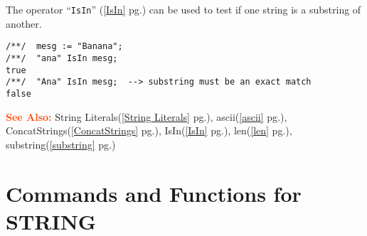 \documentclass[a4paper]{mybook}
\newcommand\SeeAlso{\par\textcolor{OrangeRed}{\textbf{\large See Also: }}}
\begin{document}
The operator ``\verb&IsIn&'' (\ref{IsIn} pg.\pageref{IsIn}) can be used to test if one string is
a substring of another.
\begin{Verbatim}[label=example, rulecolor=\color{PineGreen}, frame=single]
/**/  mesg := "Banana";
/**/  "ana" IsIn mesg;
true
/**/  "Ana" IsIn mesg;  --> substring must be an exact match
false
\end{Verbatim}


\SeeAlso %
  String Literals(\ref{String Literals} pg.\pageref{String Literals}), 
    ascii(\ref{ascii} pg.\pageref{ascii}), 
    ConcatStrings(\ref{ConcatStrings} pg.\pageref{ConcatStrings}), 
    IsIn(\ref{IsIn} pg.\pageref{IsIn}), 
    len(\ref{len} pg.\pageref{len}), 
    substring(\ref{substring} pg.\pageref{substring})

\section{Commands and Functions for STRING}
\label{Commands and Functions for STRING}

        
\end{document}
